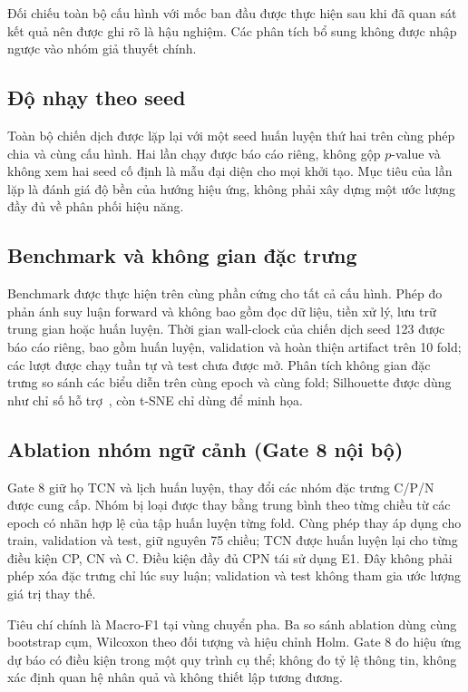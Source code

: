 Đối chiếu toàn bộ cấu hình với mốc ban đầu được thực hiện sau khi đã quan sát kết quả nên được ghi rõ là hậu nghiệm. Các phân tích bổ sung không được nhập ngược vào nhóm giả thuyết chính.

\subsection{Độ nhạy theo seed}

Toàn bộ chiến dịch được lặp lại với một seed huấn luyện thứ hai trên cùng phép chia và cùng cấu hình. Hai lần chạy được báo cáo riêng, không gộp $p$-value và không xem hai seed cố định là mẫu đại diện cho mọi khởi tạo. Mục tiêu của lần lặp là đánh giá độ bền của hướng hiệu ứng, không phải xây dựng một ước lượng đầy đủ về phân phối hiệu năng.

\subsection{Benchmark và không gian đặc trưng}

Benchmark được thực hiện trên cùng phần cứng cho tất cả cấu hình. Phép đo phản ánh suy luận forward và không bao gồm đọc dữ liệu, tiền xử lý, lưu trữ trung gian hoặc huấn luyện. Thời gian wall-clock của chiến dịch seed 123 được báo cáo riêng, bao gồm huấn luyện, validation và hoàn thiện artifact trên 10 fold; các lượt được chạy tuần tự và test chưa được mở. Phân tích không gian đặc trưng so sánh các biểu diễn trên cùng epoch và cùng fold; Silhouette được dùng như chỉ số hỗ trợ~\cite{rousseeuw1987silhouettes}, còn t-SNE chỉ dùng để minh họa.

\subsection{Ablation nhóm ngữ cảnh (Gate 8 nội bộ)}

Gate 8 giữ họ TCN và lịch huấn luyện, thay đổi các nhóm đặc trưng C/P/N được cung cấp. Nhóm bị loại được thay bằng trung bình theo từng chiều từ các epoch có nhãn hợp lệ của tập huấn luyện từng fold. Cùng phép thay áp dụng cho train, validation và test, giữ nguyên 75 chiều; TCN được huấn luyện lại cho từng điều kiện CP, CN và C. Điều kiện đầy đủ CPN tái sử dụng E1. Đây không phải phép xóa đặc trưng chỉ lúc suy luận; validation và test không tham gia ước lượng giá trị thay thế.

Tiêu chí chính là Macro-F1 tại vùng chuyển pha. Ba so sánh ablation dùng cùng bootstrap cụm, Wilcoxon theo đối tượng và hiệu chỉnh Holm. Gate 8 đo hiệu ứng dự báo có điều kiện trong một quy trình cụ thể; không đo tỷ lệ thông tin, không xác định quan hệ nhân quả và không thiết lập tương đương.

